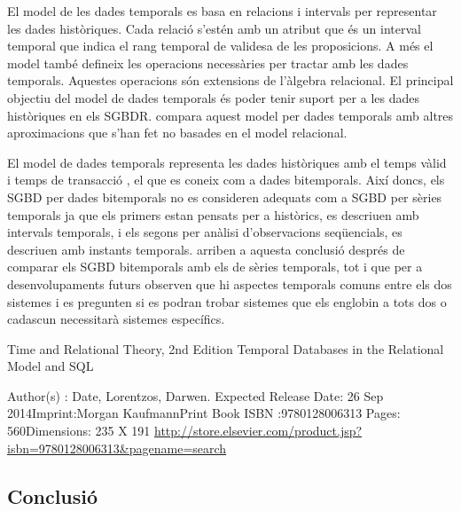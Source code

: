 El model de les dades
temporals \parencite{date02:_tempor_data_relat_model} es basa en
relacions i intervals per representar les dades històriques. Cada
relació s'estén amb un atribut que és un interval temporal que indica
el rang temporal de validesa de les proposicions. A més el model també
defineix les operacions necessàries per tractar amb les dades
temporals. Aquestes operacions són extensions de l'àlgebra relacional.
El principal objectiu del model de dades temporals és poder tenir
suport per a les dades històriques en els SGBDR.
\textcite[cap.~28]{date06} compara aquest model per dades temporals
amb altres aproximacions que s'han fet no basades en el model
relacional.



El model de dades temporals representa les dades històriques amb el
temps vàlid i temps de
transacció \parencite[cap.~15]{date02:_tempor_data_relat_model}, el
que es coneix com a dades bitemporals.  Així doncs, els SGBD per dades
bitemporals no es consideren adequats com a SGBD per sèries temporals
ja que els primers estan pensats per a històrics, es descriuen amb
intervals temporals, i els segons per anàlisi d'observacions
seqüencials, es descriuen amb instants temporals.
\textcite{schmidt95} arriben a aquesta conclusió després de comparar
els SGBD bitemporals amb els de sèries temporals, tot i que per a
desenvolupaments futurs observen que hi aspectes temporals comuns
entre els dos sistemes i es pregunten si es podran trobar sistemes que
els englobin a tots dos o cadascun necessitarà sistemes específics.







Time and Relational Theory, 2nd Edition
Temporal Databases in the Relational Model and SQL
 
Author(s) : Date,     Lorentzos,    Darwen.    Expected Release Date: 26 Sep 2014Imprint:Morgan KaufmannPrint Book ISBN :9780128006313 Pages: 560Dimensions: 235 X 191
\url{http://store.elsevier.com/product.jsp?isbn=9780128006313&pagename=search}


\subsection{Conclusió}


